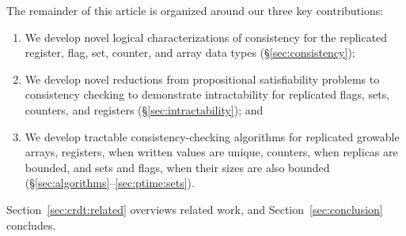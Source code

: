 The remainder of this article is organized around our three key contributions:
\begin{enumerate}

  \item We develop novel logical characterizations of consistency for the replicated register, flag, set, counter, and array data types (§\ref{sec:consistency});

  \item We develop novel reductions from propositional satisfiability problems to consistency checking to demonstrate intractability for replicated flags, sets, counters, and registers (§\ref{sec:intractability}); and

  \item We develop tractable consistency-checking algorithms for replicated growable arrays, registers, when written values are unique, counters, when replicas are bounded, and sets and flags, when their sizes are also bounded (§\ref{sec:algorithms}–\ref{sec:ptime:sets}).

\end{enumerate}
Section~\ref{sec:crdt:related} overviews related work, and Section~\ref{sec:conclusion} concludes.
